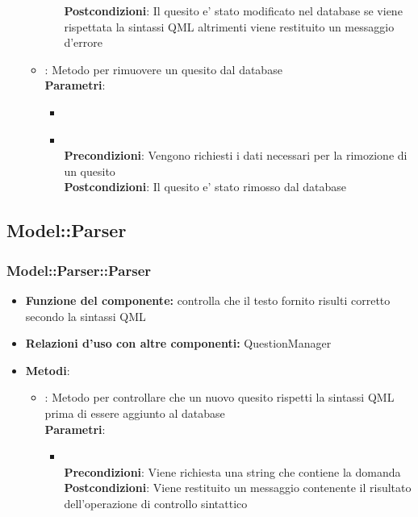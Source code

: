 \begin{itemize}
\begin{itemize}
\begin{itemize}
				\textbf{Postcondizioni}: Il quesito e' stato modificato nel database se viene rispettata la sintassi QML altrimenti viene restituito un messaggio d'errore\\
			\end{itemize}
		\item{} : Metodo per rimuovere un quesito dal database\\
		\textbf{Parametri}:
			\begin{itemize}
				\item{}\\
				\item{}\\
				\textbf{Precondizioni}: Vengono richiesti i dati necessari per la rimozione di un quesito\\
				\textbf{Postcondizioni}: Il quesito e' stato rimosso dal database\\
			\end{itemize}
	\end{itemize}
\end{itemize}

\subsection{Model::Parser}
\subsubsection{Model::Parser::Parser}
\begin{itemize}
\item\textbf{Funzione del componente:} controlla che il testo fornito risulti corretto secondo la sintassi QML
\item\textbf{Relazioni d'uso con altre componenti:} QuestionManager\\
\item\textbf{Metodi}:
	\begin{itemize}
		\item{} : Metodo per controllare che un nuovo quesito rispetti la sintassi QML prima di essere aggiunto al database\\
		\textbf{Parametri}:
			\begin{itemize}
				\item{}\\
				\textbf{Precondizioni}: Viene richiesta una string che contiene la domanda\\
				\textbf{Postcondizioni}: Viene restituito un messaggio contenente il risultato dell'operazione di controllo sintattico\\
			\end{itemize}
	\end{itemize}
\end{itemize}

